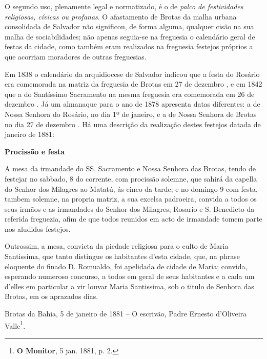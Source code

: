 O segundo uso, plenamente legal e normatizado, é o de \textit{palco de festividades religiosas, cívicas ou profanas}. O afastamento de Brotas da malha urbana consolidada de Salvador não significou, de forma alguma, qualquer cisão na sua malha de sociabilidades; não apenas seguia-se na freguesia o calendário geral de festas da cidade, como também eram realizados na freguesia festejos próprios a que acorriam moradores de outras freguesias.

Em 1838 o calendário da arquidiocese de Salvador indicou que a festa do Rosário era comemorada na matriz da freguesia de Brotas em 27 de dezembro \cite[p.~44]{arcebis_diario_1837}, e em 1842 que a do Santíssimo Sacramento na mesma freguesia era comemorada em 26 de dezembro \cite[p.~55]{arcebis_folhinha_1841}. Já um almanaque para o ano de 1878 apresenta datas diferentes: a de Nossa Senhora do Rosário, no dia 1º de janeiro, e a de Nossa Senhora de Brotas no dia 27 de dezembro \cite[pp.~53,~109]{macosta_almana_1877}. Há uma descrição da realização destes festejos datada de janeiro de 1881:

\begin{citacao}
\textbf{Procissão e festa}

A mesa da irmandade do SS. Sacramento e Nossa Senhora das Brotas, tendo de festejar no sabbado, 8 do corrente, com procissão solemne, que sahirá da capella do Senhor dos Milagres ao Matatú, ás cinco da tarde; e no domingo 9 com festa, tambem solemne, na propria matriz, a sua excelsa padroeira, convida a todos os seus irmãos e as irmandades do Senhor dos Milagres, Rosario e S. Benedicto da referida freguezia, afim de que todos reunidos em acto de irmandade tomem parte nos aludidos festejos.

Outrossim, a mesa, convicta da piedade religiosa para o culto de Maria Santissima, que tanto distingue os habitantes d'esta cidade, que, na phrase eloquente do finado D. Romualdo, foi apelidada de cidade de Maria; convida, esperando numeroso concurso, a todos em geral de seus habitantes e a cada um d'elles em particular a vir louvar Maria Santissima, sob o titulo de Senhora das Brotas, em os aprazados dias.

Brotas da Bahia, 5 de janeiro de 1881 -- O escrivão, Padre Ernesto d'Oliveira Valle\footnote{\textbf{O Monitor}, 5 jan. 1881, p. 2.}.
\end{citacao}

